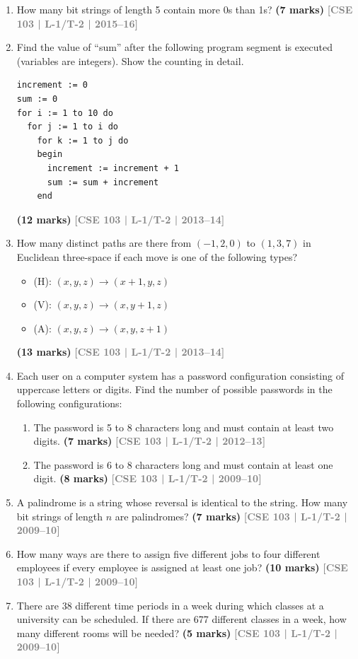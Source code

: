 \documentclass[12pt,a3paper]{article}
\newcommand{\yr}[1]{\hfill\textcolor{gray}{\small\textbf{[#1]}}}
\newcommand{\mk}[1]{\textcolor{orange!70!black}{\small\textbf{(#1 marks)}}}
\begin{document}
\begin{enumerate}
\item How many bit strings of length 5 contain more 0s than 1s?
\mk{7} \yr{CSE 103 | L-1/T-2 | 2015--16}

\item Find the value of ``sum'' after the following program segment is executed (variables are integers). Show the counting in detail.
\begin{lstlisting}
increment := 0
sum := 0
for i := 1 to 10 do
  for j := 1 to i do
    for k := 1 to j do
    begin
      increment := increment + 1
      sum := sum + increment
    end
\end{lstlisting}
\mk{12} \yr{CSE 103 | L-1/T-2 | 2013--14}

\item How many distinct paths are there from $(-1, 2, 0)$ to $(1, 3, 7)$ in Euclidean three-space if each move is one of the following types?
\begin{itemize}
  \item (H): $(x,y,z) \to (x+1,y,z)$
  \item (V): $(x,y,z) \to (x,y+1,z)$
  \item (A): $(x,y,z) \to (x,y,z+1)$
\end{itemize}
\mk{13} \yr{CSE 103 | L-1/T-2 | 2013--14} 

\item Each user on a computer system has a password configuration consisting of uppercase letters or digits. Find the number of possible passwords in the following configurations:
\begin{enumerate}
  \item The password is 5 to 8 characters long and must contain at least two digits. \mk{7} \yr{CSE 103 | L-1/T-2 | 2012--13}
  \item The password is 6 to 8 characters long and must contain at least one digit. \mk{8} \yr{CSE 103 | L-1/T-2 | 2009--10}
\end{enumerate}

\item A palindrome is a string whose reversal is identical to the string. How many bit strings of length $n$ are palindromes?
\mk{7} \yr{CSE 103 | L-1/T-2 | 2009--10}

\item How many ways are there to assign five different jobs to four different employees if every employee is assigned at least one job?
\mk{10} \yr{CSE 103 | L-1/T-2 | 2009--10}

\item There are 38 different time periods in a week during which classes at a university can be scheduled. If there are 677 different classes in a week, how many different rooms will be needed?
\mk{5} \yr{CSE 103 | L-1/T-2 | 2009--10}

\end{enumerate}
\end{document}
